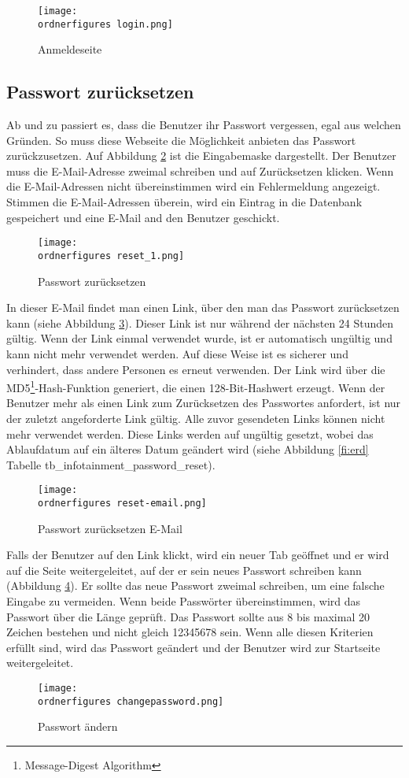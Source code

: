 \begin{figure}[H]
	\centering
	\texttt{[image: \\ordnerfigures login.png]}
	\caption{Anmeldeseite}
	\label{fi:login}
\end{figure}

\subsection{Passwort zurücksetzen}
Ab und zu passiert es, dass die Benutzer ihr Passwort vergessen, egal aus welchen Gründen. So muss diese Webseite die Möglichkeit anbieten das Passwort zurückzusetzen. Auf Abbildung \ref{fi:reset} ist die Eingabemaske dargestellt. Der Benutzer muss die E-Mail-Adresse zweimal schreiben und auf Zurücksetzen klicken. Wenn die E-Mail-Adressen nicht übereinstimmen wird ein Fehlermeldung angezeigt. Stimmen die E-Mail-Adressen überein, wird ein Eintrag in die Datenbank gespeichert und eine E-Mail and den Benutzer geschickt.
\begin{figure}[H]
	\centering
	\texttt{[image: \\ordnerfigures reset\_1.png]}
	\caption{Passwort zurücksetzen}
	\label{fi:reset}
\end{figure}

In dieser E-Mail findet man einen Link, über den man das Passwort zurücksetzen kann (siehe Abbildung \ref{fi:resetemail}). Dieser Link ist nur während der nächsten 24 Stunden gültig. Wenn der Link einmal verwendet wurde, ist er automatisch ungültig und kann nicht mehr verwendet werden. Auf diese Weise ist es sicherer und verhindert, dass andere Personen es erneut verwenden. Der Link wird über die MD5\footnote{Message-Digest Algorithm }-Hash-Funktion generiert, die einen 128-Bit-Hashwert erzeugt. Wenn der Benutzer mehr als einen Link zum Zurücksetzen des Passwortes anfordert, ist nur der zuletzt angeforderte Link gültig. Alle zuvor gesendeten Links können nicht mehr verwendet werden. Diese Links werden auf ungültig gesetzt, wobei das Ablaufdatum auf ein älteres Datum geändert wird (siehe Abbildung \ref{fi:erd} Tabelle tb\_infotainment\_password\_reset). 

\begin{figure}[H]
	\centering
	\texttt{[image: \\ordnerfigures reset-email.png]}
	\caption{Passwort zurücksetzen E-Mail}
	\label{fi:resetemail}
\end{figure}

Falls der Benutzer auf den Link klickt, wird ein neuer Tab geöffnet und er wird auf die Seite weitergeleitet, auf der er sein neues Passwort schreiben kann (Abbildung \ref{fi:reset-password}). Er sollte das neue Passwort zweimal schreiben, um eine falsche Eingabe zu vermeiden. Wenn beide Passwörter übereinstimmen, wird das Passwort über die Länge geprüft. Das Passwort sollte aus 8 bis maximal 20 Zeichen bestehen und nicht gleich 12345678 sein.
Wenn alle diesen Kriterien erfüllt sind, wird das Passwort geändert und der Benutzer wird zur Startseite weitergeleitet.
\begin{figure}[H]
	\centering
	\texttt{[image: \\ordnerfigures changepassword.png]}
	\caption{Passwort ändern}
	\label{fi:reset-password}
\end{figure}

